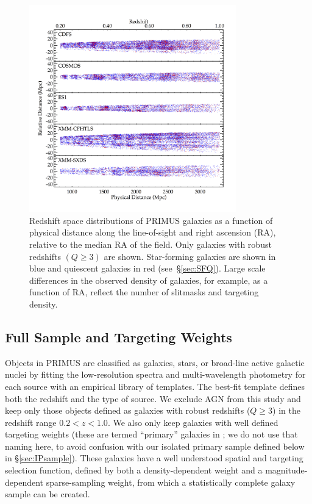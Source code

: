 \begin{figure}
  \centering
  \includegraphics[width=0.8\textwidth,natwidth=600,trim={0.2in 0.5in 0.4in 0.6in},clip]{figures/cone_diagrams.png}
  \caption{Redshift space distributions of PRIMUS galaxies as a function of physical distance along the line-of-sight and right ascension 
(RA), relative to 
the median RA of the field.
Only galaxies with robust redshifts ${(Q \ge 3)}$ are shown.
Star-forming galaxies are shown in blue and quiescent galaxies in red (see~\S\ref{sec:SFQ}). Large scale differences in the observed 
density of galaxies, 
for example, as a function of RA, reflect the number of slitmasks and targeting density.
}
  \label{fig:cone_diagrams}
\end{figure}

\subsection{Full Sample and Targeting Weights}\label{sec:targ_weight}
 

Objects in PRIMUS are classified as galaxies, stars, or broad-line active galactic nuclei by fitting the low-resolution spectra and multi-wavelength photometry 
for each source with an empirical library of templates.
The best-fit template defines both the redshift and the type of source.  
We exclude AGN from this study and keep only those objects defined as galaxies with robust redshifts {($Q\ge 3$)} in the redshift range ${0.2<z<1.0}$.
We also only keep galaxies with well defined targeting weights (these are termed ``primary'' galaxies in \citet{Coil11}; we do not use that naming here, to avoid 
confusion with our isolated primary sample defined below in \S\ref{sec:IPsample}).
These galaxies have a well understood spatial and targeting selection function, defined by both a density-dependent weight and a magnitude-dependent sparse-sampling 
weight, from which a statistically complete galaxy sample can be created.

